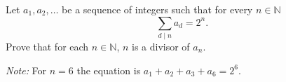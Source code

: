 Let $a_1, a_2, \ldots$ be a sequence of integers such that for every $n \in \mathbb{N}$
$$\sum_{d\mid n}a_d = 2^n.$$
Prove that for each $n \in \mathbb{N}$, $n$ is a divisor of $a_n$.

\emph{Note:} For $n=6$ the equation is $a_1+a_2+a_3+a_6=2^6$.
